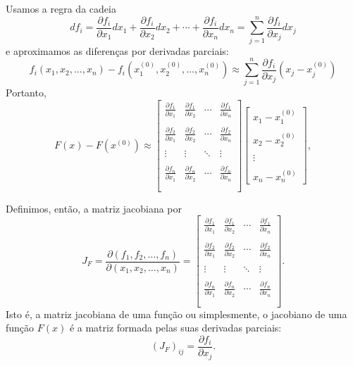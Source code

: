 Usamos a regra da cadeia
$$df_i = \frac{\partial f_i}{\partial x_1} dx_1+\frac{\partial f_i}{\partial x_2} dx_2+\cdots + \frac{\partial f_i}{\partial x_n} dx_n=\sum_{j=1}^n\frac{\partial f_i}{\partial x_j} dx_j$$
e aproximamos as diferenças por derivadas parciais:
$$ f_i(x_1,x_2,\ldots,x_n)-f_i(x_1^{(0)},x_2^{(0)},\ldots,x_n^{(0)})\approx \sum_{j=1}^n \frac{\partial f_i}{\partial x_j}\left(x_j-x_j^{(0)}\right)$$
Portanto,
\begin{equation}\label{eq_approx_newton}F(x)-F(x^{(0)})\approx \left[
\begin{array}{ccccc}
\frac{\partial f_1}{\partial x_1}&\frac{\partial f_1}{\partial x_2}&\cdots&\frac{\partial f_1}{\partial x_n}\\~\\
\frac{\partial f_2}{\partial x_1}&\frac{\partial f_2}{\partial x_2}&\cdots&\frac{\partial f_2}{\partial x_n}\\~\\
\vdots&\vdots&\ddots&\vdots\\~\\
\frac{\partial f_n}{\partial x_1}&\frac{\partial f_n}{\partial x_2}&\cdots&\frac{\partial f_n}{\partial x_n}\\~\\
\end{array}
\right]\left[
\begin{array}{c}
x_1-x_1^{(0)}\\~~\\
x_2-x_2^{(0)}\\~~\\
\vdots\\~~\\
x_n-x_n^{(0)}
\end{array}
\right],
\end{equation}

Definimos, então, a matriz jacobiana por
$$J_F= \frac{\partial(f_1,f_2,\ldots,f_n)}{\partial(x_1,x_2,\ldots,x_n)}=\left[
\begin{array}{ccccc}
\frac{\partial f_1}{\partial x_1}&\frac{\partial f_1}{\partial x_2}&\cdots&\frac{\partial f_1}{\partial x_n}\\~\\
\frac{\partial f_2}{\partial x_1}&\frac{\partial f_2}{\partial x_2}&\cdots&\frac{\partial f_2}{\partial x_n}\\~\\
\vdots&\vdots&\ddots&\vdots\\~\\
\frac{\partial f_n}{\partial x_1}&\frac{\partial f_n}{\partial x_2}&\cdots&\frac{\partial f_n}{\partial x_n}\\~\\
\end{array}
\right].
$$
Isto é, a matriz jacobiana de uma função ou simplesmente, o jacobiano de uma função $F(x)$ é a matriz formada pelas suas derivadas parciais:
$$\left(J_F\right)_{ij}=\frac{\partial f_i}{\partial x_j}.$$

